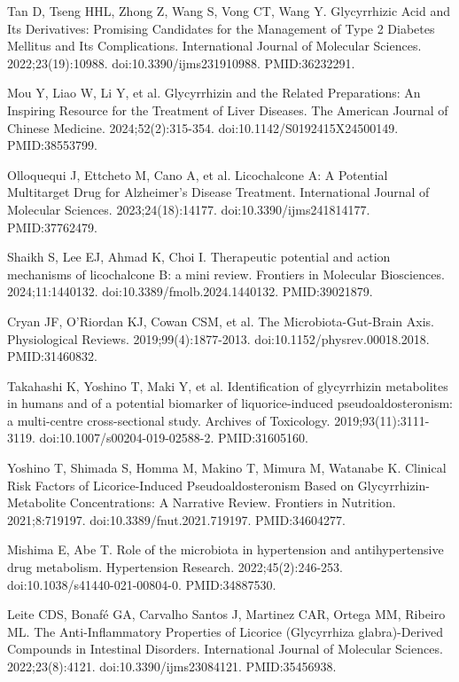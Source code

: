 \documentclass[12pt,oneside]{book}
\newcommand{\reff}[2]{\par\hangindent=7mm\hangafter=1\noindent[#1]\hspace{2mm}#2\par}
\begin{document}
\reff{9}{Tan D, Tseng HHL, Zhong Z, Wang S, Vong CT, Wang Y. Glycyrrhizic Acid and Its Derivatives: Promising Candidates for the Management of Type 2 Diabetes Mellitus and Its Complications. International Journal of Molecular Sciences. 2022;23(19):10988. doi:10.3390/ijms231910988. PMID:36232291.}

\reff{10}{Mou Y, Liao W, Li Y, et al. Glycyrrhizin and the Related Preparations: An Inspiring Resource for the Treatment of Liver Diseases. The American Journal of Chinese Medicine. 2024;52(2):315-354. doi:10.1142/S0192415X24500149. PMID:38553799.}

\reff{11}{Olloquequi J, Ettcheto M, Cano A, et al. Licochalcone A: A Potential Multitarget Drug for Alzheimer's Disease Treatment. International Journal of Molecular Sciences. 2023;24(18):14177. doi:10.3390/ijms241814177. PMID:37762479.}

\reff{12}{Shaikh S, Lee EJ, Ahmad K, Choi I. Therapeutic potential and action mechanisms of licochalcone B: a mini review. Frontiers in Molecular Biosciences. 2024;11:1440132. doi:10.3389/fmolb.2024.1440132. PMID:39021879.}

\reff{13}{Cryan JF, O'Riordan KJ, Cowan CSM, et al. The Microbiota-Gut-Brain Axis. Physiological Reviews. 2019;99(4):1877-2013. doi:10.1152/physrev.00018.2018. PMID:31460832.}

\reff{14}{Takahashi K, Yoshino T, Maki Y, et al. Identification of glycyrrhizin metabolites in humans and of a potential biomarker of liquorice-induced pseudoaldosteronism: a multi-centre cross-sectional study. Archives of Toxicology. 2019;93(11):3111-3119. doi:10.1007/s00204-019-02588-2. PMID:31605160.}

\reff{15}{Yoshino T, Shimada S, Homma M, Makino T, Mimura M, Watanabe K. Clinical Risk Factors of Licorice-Induced Pseudoaldosteronism Based on Glycyrrhizin-Metabolite Concentrations: A Narrative Review. Frontiers in Nutrition. 2021;8:719197. doi:10.3389/fnut.2021.719197. PMID:34604277.}

\reff{16}{Mishima E, Abe T. Role of the microbiota in hypertension and antihypertensive drug metabolism. Hypertension Research. 2022;45(2):246-253. doi:10.1038/s41440-021-00804-0. PMID:34887530.}

\reff{17}{Leite CDS, Bonafé GA, Carvalho Santos J, Martinez CAR, Ortega MM, Ribeiro ML. The Anti-Inflammatory Properties of Licorice (Glycyrrhiza glabra)-Derived Compounds in Intestinal Disorders. International Journal of Molecular Sciences. 2022;23(8):4121. doi:10.3390/ijms23084121. PMID:35456938.}
\end{document}
